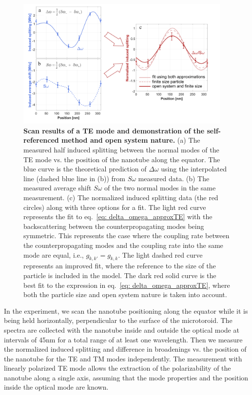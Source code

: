 \documentclass[journal=jacsat,manuscript=article]{achemso}
\begin{document}
\begin{figure}[H]
\centering
   \includegraphics[width=0.95\textwidth]{Images/data_plot_19_TE_forPaper_subplot1C.png}
        \caption{\textbf{Scan results of a TE mode and demonstration of the self-referenced method and open system nature.} (a) The measured half induced splitting between the normal modes of the TE mode vs. the position of the nanotube along the equator. The blue curve is the theoretical prediction of $\Delta \omega$ using the interpolated line (dashed blue line in (b)) from $\textit{S}\omega$ measured data. (b) The measured average shift $\textit{S}\omega$ of the two normal modes in the same measurement. (c) The normalized induced splitting data (the red circles) along with three options for a fit. The light red curve represents the fit to eq.~\ref{eq: delta_omega_approxTE} with the backscattering between the counterpropagating modes being symmetric. This represents the case where the coupling rate between the counterpropagating modes and the coupling rate into the same mode are equal, i.e., $g_{k,k'} = g_{k,k}$. The light dashed red curve represents an improved fit, where the reference to the size of the particle is included in the model. The dark red solid curve is the best fit to the expression in eq.~\ref{eq: delta_omega_approxTE}, where both the particle size and open system nature is taken into account.}
\label{fig:TE_set19_splitting}
\end{figure}

In the experiment, we scan the nanotube positioning along the equator while it is being held horizontally, perpendicular to the surface of the microtoroid. The spectra are collected with the nanotube inside and outside the optical mode at intervals of 45nm for a total range of at least one wavelength. Then we measure the normalized induced splitting and difference in broadenings vs. the position of the nanotube for the TE and TM modes independently. The measurement with linearly polarized TE mode allows the extraction of the polarizability of the nanotube along a single axis, assuming that the mode properties and the position inside the optical mode are known.
\end{document}
